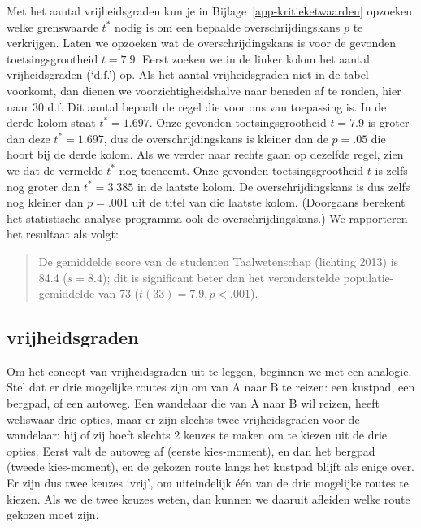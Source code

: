 \documentclass[
]{book}
\begin{document}
Met het aantal vrijheidsgraden kun je in
Bijlage~\ref{app-kritieketwaarden} opzoeken welke grenswaarde \(t^*\)
nodig is om een bepaalde overschrijdingskans \(p\) te verkrijgen. Laten we
opzoeken wat de overschrijdingskans is voor de gevonden
toetsingsgrootheid \(t=7.9\). Eerst zoeken we in de linker kolom het
aantal vrijheidsgraden (`d.f.') op. Als het aantal vrijheidsgraden niet
in de tabel voorkomt, dan dienen we voorzichtigheidshalve naar beneden
af te ronden, hier naar 30 d.f. Dit aantal bepaalt de regel die voor ons
van toepassing is. In de derde kolom staat \(t^*=1.697\). Onze gevonden
toetsingsgrootheid \(t=7.9\) is groter dan deze \(t^*=1.697\), dus de
overschrijdingskans is kleiner dan de \(p=.05\) die hoort bij de derde
kolom. Als we verder naar rechts gaan op dezelfde regel, zien we dat de
vermelde \(t^*\) nog toeneemt. Onze gevonden toetsingsgrootheid \(t\) is
zelfs nog groter dan \(t^*=3.385\) in de laatste kolom. De
overschrijdingskans is dus zelfs nog kleiner dan \(p=.001\) uit de titel
van die laatste kolom. (Doorgaans berekent het statistische
analyse-programma ook de overschrijdingskans.) We rapporteren het
resultaat als volgt:

\begin{quote}
De gemiddelde score van de studenten Taalwetenschap (lichting 2013) is
84.4 (\(s=8.4\)); dit is significant beter dan het veronderstelde
populatie-gemiddelde van 73 (\(t(33)=7.9, p<.001\)).
\end{quote}

\subsection{vrijheidsgraden}\label{sec:ttoets-vrijheidsgraden}

Om het concept van vrijheidsgraden uit te leggen, beginnen we met een
analogie. Stel dat er drie mogelijke routes zijn om van A naar B te
reizen: een kustpad, een bergpad, of een autoweg. Een wandelaar die van
A naar B wil reizen, heeft weliswaar drie opties, maar er zijn slechts
twee vrijheidsgraden voor de wandelaar: hij of zij hoeft slechts 2
keuzes te maken om te kiezen uit de drie opties. Eerst valt de autoweg
af (eerste kies-moment), en dan het bergpad (tweede kies-moment), en de
gekozen route langs het kustpad blijft als enige over. Er zijn dus twee
keuzes `vrij', om uiteindelijk één van de drie mogelijke routes te
kiezen. Als we de twee keuzes weten, dan kunnen we daaruit afleiden
welke route gekozen moet zijn.
\end{document}
